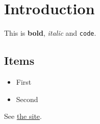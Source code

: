 \documentclass{article}
\begin{document}
\section{Introduction}
This is \textbf{bold}, \textit{italic} and \texttt{code}.
\subsection{Items}
\begin{itemize}
\item First
\item Second
\end{itemize}
See \href{https://example.com}{the site}.
\end{document}
